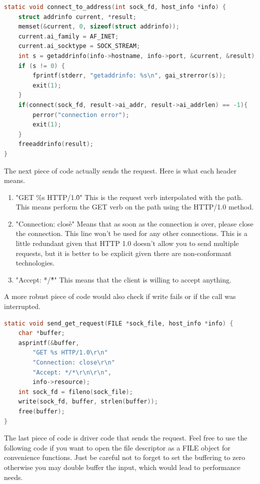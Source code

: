 \begin{lstlisting}[language=C]
static void connect_to_address(int sock_fd, host_info *info) {
	struct addrinfo current, *result;
 	memset(&current, 0, sizeof(struct addrinfo));
 	current.ai_family = AF_INET;
 	current.ai_socktype = SOCK_STREAM;
	int s = getaddrinfo(info->hostname, info->port, &current, &result);
 	if (s != 0) {
		fprintf(stderr, "getaddrinfo: %s\n", gai_strerror(s));
		exit(1);
 	}
	if(connect(sock_fd, result->ai_addr, result->ai_addrlen) == -1){
		perror("connection error");
		exit(1);
	}
	freeaddrinfo(result);
}
\end{lstlisting}

The next piece of code actually sends the request. Here is what each header means.

\begin{enumerate}
  \item "GET \%s HTTP/1.0\r\n" This is the request verb interpolated with the path. This means perform the GET verb on the path using the HTTP/1.0 method.
  \item "Connection: close\r\n" Means that as soon as the connection is over, please close the connection. This line won't be used for any other connections.
    This is a little redundant given that HTTP 1.0 doesn't allow you to send multiple requests, but it is better to be explicit given there are non-conformant technologies.
  \item "Accept: */*\r\n\r\n" This means that the client is willing to accept anything.
\end{enumerate}

A more robust piece of code would also check if write fails or if the call was interrupted.

\begin{lstlisting}[language=C]
static void send_get_request(FILE *sock_file, host_info *info) {
	char *buffer;
	asprintf(&buffer,
		"GET %s HTTP/1.0\r\n"
		"Connection: close\r\n"
		"Accept: */*\r\n\r\n",
		info->resource);
	int sock_fd = fileno(sock_file);
	write(sock_fd, buffer, strlen(buffer));
	free(buffer);
}
\end{lstlisting}

The last piece of code is driver code that sends the request.
Feel free to use the following code if you want to open the file descriptor as a FILE object for convenience functions.
Just be careful not to forget to set the buffering to zero otherwise you may double buffer the input, which would lead to performance needs.

